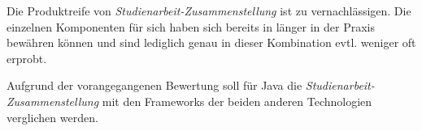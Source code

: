 Die Produktreife von \emph{Studienarbeit-Zusammenstellung} ist zu vernachlässigen. Die einzelnen Komponenten für sich haben sich bereits in länger in der Praxis bewähren können und sind lediglich genau in dieser Kombination evtl. weniger oft erprobt.

Aufgrund der vorangegangenen Bewertung soll für Java die \emph{Studienarbeit-Zusammenstellung} mit den Frameworks der beiden anderen Technologien verglichen werden.